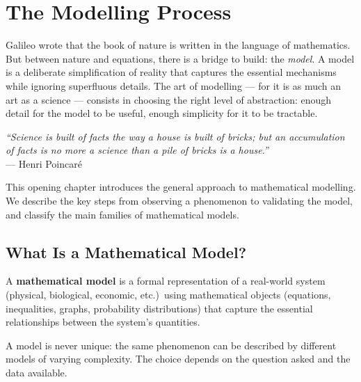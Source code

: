 \chapter{The Modelling Process}
\label{ch:process}

Galileo wrote that the book of nature is written in the language of
mathematics. But between nature and equations, there is a bridge to build:
the \emph{model}. A model is a deliberate simplification of reality that
captures the essential mechanisms while ignoring superfluous details. The art
of modelling --- for it is as much an art as a science --- consists in
choosing the right level of abstraction: enough detail for the model to be
useful, enough simplicity for it to be tractable.

\begin{center}
\textit{``Science is built of facts the way a house is built of bricks;
but an accumulation of facts is no more a science than a pile of
bricks is a house.''}\\[4pt]
--- Henri Poincar\'e
\end{center}

\bigskip

This opening chapter introduces the general approach to mathematical
modelling.  We describe the key steps from observing a phenomenon to
validating the model, and classify the main families of mathematical models.

\section{What Is a Mathematical Model?}

\begin{definition}
A \textbf{mathematical model} is a formal representation of a real-world
system (physical, biological, economic, etc.)\ using mathematical
objects (equations, inequalities, graphs, probability distributions)
that capture the essential relationships between the system's quantities.
\end{definition}

\begin{remark}
A model is never unique: the same phenomenon can be described by
different models of varying complexity.  The choice depends on the
question asked and the data available.
\end{remark}

